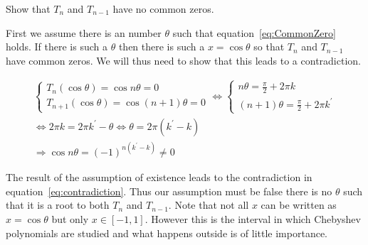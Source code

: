 \begin{problem}
  Show that $T_n$ and $T_{n−1}$ have no common zeros.
\end{problem}

\begin{solution}
  First we assume there is an number $\theta$ such that
  equation~\ref{eq:CommonZero} holds. If there is such a $\theta$ then
  there is such a $x = \cos\theta$ so that $T_n$ and $T_{n−1}$ have
  common zeros. We will thus need to show that this leads to a
  contradiction.
  
  \begin{align}
    \label{eq:CommonZero}
    \begin{cases}
      T_n(\cos\theta) = \cos n\theta = 0 \\
      T_{n+1}(\cos\theta) = \cos (n+1)\theta = 0
    \end{cases}
    \Leftrightarrow
    \begin{cases}
      n\theta = \frac{\pi}{2} + 2\pi k \\
      (n+1)\theta = \frac{\pi}{2} + 2\pi k^{\prime}
    \end{cases} \\
    \nonumber
    \Leftrightarrow
    2 \pi k = 2 \pi k^{\prime} - \theta 
    \Leftrightarrow
    \theta = 2 \pi (k^{\prime} - k) \\
    \label{eq:contradiction}
    \Rightarrow
    \cos n\theta = {(-1)}^{n(k^{\prime} - k)} \neq 0 
  \end{align}

  The result of the assumption of existence leads to the contradiction
  in equation~\ref{eq:contradiction}. Thus our assumption must be
  false there is no $\theta$ such that it is a root to both $T_n$ and
  $T_{n−1}$. Note that not all $x$ can be written as
  $x = \cos \theta$ but only $x \in [-1, 1]$. However this is the
  interval in which Chebyshev polynomials are studied and what happens
  outside is of little importance.
\end{solution}


